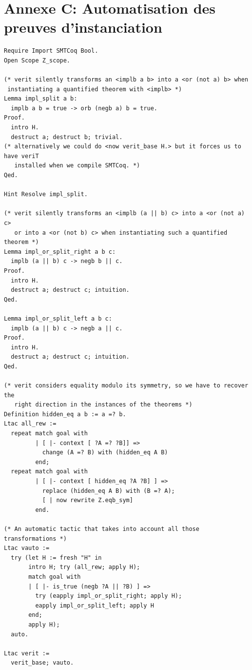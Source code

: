 \documentclass[11pt]{article}
\begin{document}
\section*{Annexe C: Automatisation des preuves d'instanciation}
\lstset{language=coq}
\begin{lstlisting}[frame=single]
Require Import SMTCoq Bool.
Open Scope Z_scope.

(* verit silently transforms an <implb a b> into a <or (not a) b> when
 instantiating a quantified theorem with <implb> *)
Lemma impl_split a b:
  implb a b = true -> orb (negb a) b = true.
Proof.
  intro H.
  destruct a; destruct b; trivial.
(* alternatively we could do <now verit_base H.> but it forces us to have veriT
   installed when we compile SMTCoq. *)
Qed.

Hint Resolve impl_split.

(* verit silently transforms an <implb (a || b) c> into a <or (not a) c> 
   or into a <or (not b) c> when instantiating such a quantified theorem *)
Lemma impl_or_split_right a b c:
  implb (a || b) c -> negb b || c.
Proof.
  intro H.
  destruct a; destruct c; intuition. 
Qed.

Lemma impl_or_split_left a b c:
  implb (a || b) c -> negb a || c.
Proof.
  intro H.
  destruct a; destruct c; intuition.
Qed.

(* verit considers equality modulo its symmetry, so we have to recover the
   right direction in the instances of the theorems *)
Definition hidden_eq a b := a =? b.
Ltac all_rew :=
  repeat match goal with
         | [ |- context [ ?A =? ?B]] =>
           change (A =? B) with (hidden_eq A B)
         end;
  repeat match goal with
         | [ |- context [ hidden_eq ?A ?B] ] =>
           replace (hidden_eq A B) with (B =? A);
           [ | now rewrite Z.eqb_sym]
         end.

(* An automatic tactic that takes into account all those transformations *)
Ltac vauto :=
  try (let H := fresh "H" in
       intro H; try (all_rew; apply H);
       match goal with
       | [ |- is_true (negb ?A || ?B) ] =>
         try (eapply impl_or_split_right; apply H);
         eapply impl_or_split_left; apply H
       end;
       apply H);
  auto.

Ltac verit :=
  verit_base; vauto.
\end{lstlisting}
\end{document}

